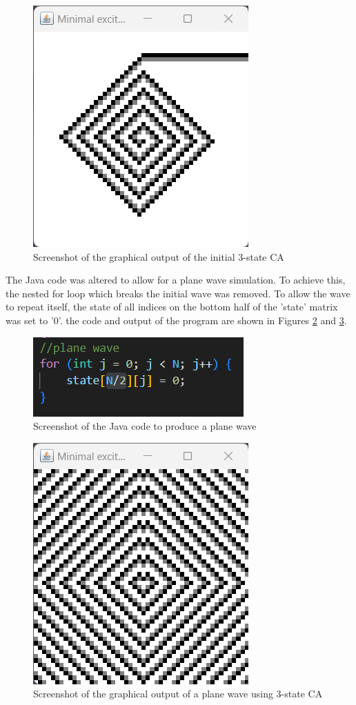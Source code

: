 \begin{figure}[H] 
    \centering
    \includegraphics[width=0.49\columnwidth]{Figures/Week 6/3stateCA-Initial.png}
    \caption{Screenshot of the graphical output of the initial 3-state CA}
    \label{fig:W6-initial-3CA}
\end{figure}

The Java code was altered to allow for a plane wave simulation. To achieve this, the nested for loop which breaks the initial wave was removed. To allow the wave to repeat itself, the state of all indices on the bottom half of the 'state' matrix was set to '0'. the code and output of the program are shown in Figures \ref{fig:W6-3CA-plane-code} and \ref{fig:W6-3CA-plane-output}. 


\begin{figure}[H] 
    \centering
    \includegraphics[width=0.49\columnwidth]{Figures/Week 6/3stateCA-plane-code.png}
    \caption{Screenshot of the Java code to produce a plane wave}
    \label{fig:W6-3CA-plane-code}
\end{figure}

\begin{figure}[H] 
    \centering
    \includegraphics[width=0.49\columnwidth]{Figures/Week 6/3stateCA-plane-output.png}
    \caption{Screenshot of the graphical output of a plane wave using 3-state CA}
    \label{fig:W6-3CA-plane-output}
\end{figure}



